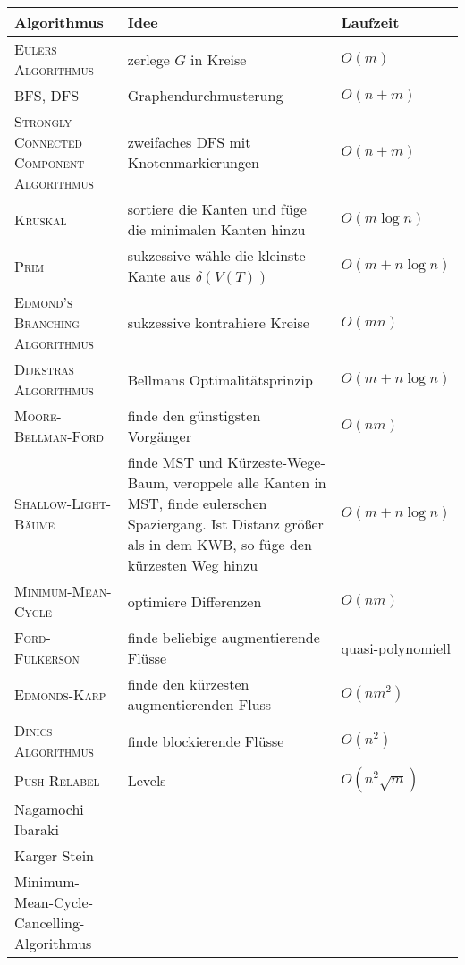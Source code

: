\begin{table}[h]
    \centering
    \begin{tabular}{m{5cm} m{9cm} m{2.3cm}}
        \toprule
         Algorithmus & Idee & Laufzeit  \\
         \midrule
         \textsc{Eulers Algorithmus} & zerlege $G$ in Kreise & $O(m)$ \\
         \midrule
         \textsc{BFS}, \textsc{DFS} & Graphendurchmusterung & $O(n+m)$ \\
         \textsc{Strongly Connected Component Algorithmus} & zweifaches DFS mit Knotenmarkierungen & $O(n+m)$ \\
         \midrule
         \textsc{Kruskal} & sortiere die Kanten und füge die minimalen Kanten hinzu & $O(m\log n)$ \\
         \textsc{Prim} & sukzessive wähle die kleinste Kante aus $\delta(V(T))$ & $O(m+n \log n)$\\
         \midrule
         \textsc{Edmond's Branching Algorithmus} & sukzessive kontrahiere Kreise & $O(mn)$ \\
         \midrule
         \textsc{Dijkstras Algorithmus} & Bellmans Optimalitätsprinzip & $O(m+n\log n)$\\
         \textsc{Moore-Bellman-Ford} & finde den günstigsten Vorgänger & $O(nm)$ \\
         \midrule
         \textsc{Shallow-Light-Bäume} & finde MST und Kürzeste-Wege-Baum, veroppele alle Kanten in MST, finde eulerschen Spaziergang. Ist Distanz größer als in dem KWB, so füge den kürzesten Weg hinzu & $O(m+n\log n)$ \\
         \midrule
         \textsc{Minimum-Mean-Cycle} & optimiere Differenzen & $O(nm)$ \\
         \midrule
         \textsc{Ford-Fulkerson} & finde beliebige augmentierende Flüsse & quasi-polynomiell \\
         \textsc{Edmonds-Karp} & finde den kürzesten augmentierenden Fluss & $O(n m^2)$ \\
         \textsc{Dinics Algorithmus} & finde blockierende Flüsse & $O(n^2)$\\
         \textsc{Push-Relabel} & Levels & $O(n^2\sqrt{m})$\\ 
         \midrule
         Nagamochi Ibaraki & & \\
         Karger Stein & & \\
         Minimum-Mean-Cycle-Cancelling-Algorithmus & & \\
         \bottomrule
    \end{tabular}
\end{table}

